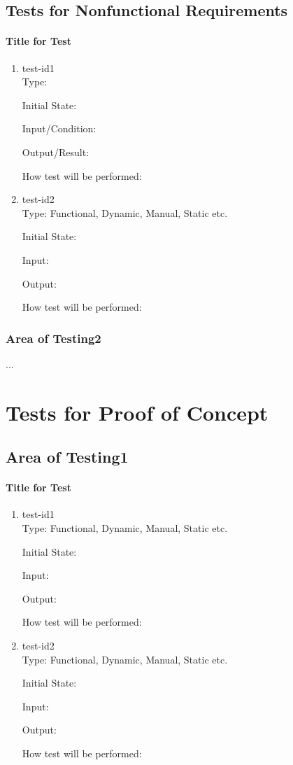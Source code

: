 \documentclass[12pt, titlepage]{article}
\begin{document}
	
\subsection{Tests for Nonfunctional Requirements}
		
\paragraph{Title for Test}
\begin{enumerate}
\item{test-id1\\}
Type: 
					
Initial State: 
					
Input/Condition: 
					
Output/Result: 
					
How test will be performed: 
					
\item{test-id2\\}
Type: Functional, Dynamic, Manual, Static etc.
					
Initial State: 
					
Input: 
					
Output: 
					
How test will be performed: 
\end{enumerate}
\subsubsection{Area of Testing2}
...
\section{Tests for Proof of Concept}
\subsection{Area of Testing1}
		
\paragraph{Title for Test}
\begin{enumerate}
\item{test-id1\\}
Type: Functional, Dynamic, Manual, Static etc.
					
Initial State: 
					
Input: 
					
Output: 
					
How test will be performed: 
					
\item{test-id2\\}
Type: Functional, Dynamic, Manual, Static etc.
					
Initial State: 
					
Input: 
					
Output: 
					
How test will be performed: 
\end{enumerate}
\end{document}
